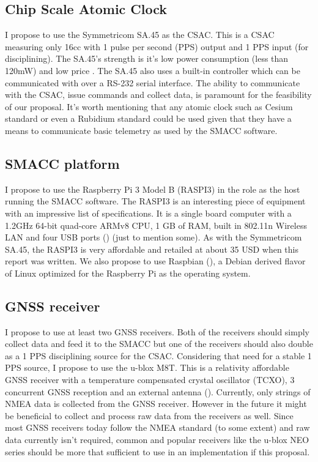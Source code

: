 \documentclass[12pt,english,a4paper]{report}
\begin{document}
\subsection{Chip Scale Atomic Clock}
I propose to use the Symmetricom SA.45 as the CSAC. This is a CSAC measuring only 16cc with 1 pulse per second (PPS) output and 1 PPS input (for disciplining). The SA.45's strength is it's low power consumption (less than 120mW) and low price \cite{SADS}. The SA.45 also uses a built-in controller which can be communicated with over a RS-232 serial interface. The ability to communicate with the CSAC, issue commands and collect data, is paramount for the feasibility of our proposal. It's worth mentioning that any atomic clock such as Cesium standard or even a Rubidium standard could be used given that they have a means to communicate basic telemetry as used by the SMACC software.

\subsection{SMACC platform}
I propose to use the Raspberry Pi 3 Model B (RASPI3) in the role as the host running the SMACC software. The RASPI3 is an interesting piece of equipment with an impressive list of specifications. It is a single board computer with a 1.2GHz 64-bit quad-core ARMv8 CPU, 1 GB of RAM, built in 802.11n Wireless LAN and four USB ports (\cite{RASPI}) (just to mention some). As with the Symmetricom SA.45, the RASPI3 is very affordable and retailed at about 35 USD when this report was written. We also propose to use Raspbian (\cite{RASPBIAN}), a Debian derived flavor of Linux optimized for the Raspberry Pi as the operating system. 

\subsection{GNSS receiver}
I propose to use at least two GNSS receivers. Both of the receivers should simply collect data and feed it to the SMACC but one of the receivers should also double as a 1 PPS disciplining source for the CSAC. Considering that need for a stable 1 PPS source, I propose to use the u-blox M8T. This is a relativity affordable GNSS receiver with a temperature compensated crystal oscillator (TCXO), 3 concurrent GNSS reception and an external antenna (\cite{UBLOXM8T}). Currently, only strings of NMEA data is collected from the GNSS receiver. However in the future it might be beneficial to collect and process raw data from the receivers as well. Since most GNSS receivers today follow the NMEA standard (to some extent) and raw data currently isn't required, common and popular receivers like the u-blox NEO series should be more that sufficient to use in an implementation if this proposal.
\end{document}
